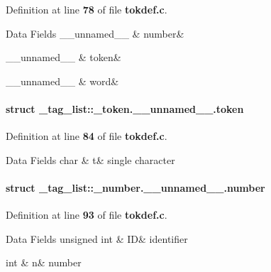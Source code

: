 \-Definition at line {\bf 78} of file {\bf tokdef.\-c}.

\begin{DoxyFields}{\-Data Fields}
\-\_\-\-\_\-unnamed\-\_\-\-\_\-\label{tokdef_8c_ab1bc248a7ff2b2e95569f56de68615df}
&
number&
\\
\hline

\-\_\-\-\_\-unnamed\-\_\-\-\_\-\label{tokdef_8c_a94a08da1fecbb6e8b46990538c7b50b2}
&
token&
\\
\hline

\-\_\-\-\_\-unnamed\-\_\-\-\_\-\label{tokdef_8c_ac47d187067c6cf953245f128b5fde62a}
&
word&
\\
\hline

\end{DoxyFields}
\label{struct__tag__list_1_1__token_8____unnamed_____8token}
\paragraph{struct \-\_\-tag\-\_\-list\-:\-:\-\_\-token.\-\_\-\-\_\-unnamed\-\_\-\-\_\-.\-token}


\-Definition at line {\bf 84} of file {\bf tokdef.\-c}.

\begin{DoxyFields}{\-Data Fields}
char\label{tokdef_8c_ae358efa489f58062f10dd7316b65649e}
&
t&
single character \\
\hline

\end{DoxyFields}
\label{struct__tag__list_1_1__number_8____unnamed_____8number}
\paragraph{struct \-\_\-tag\-\_\-list\-:\-:\-\_\-number.\-\_\-\-\_\-unnamed\-\_\-\-\_\-.\-number}


\-Definition at line {\bf 93} of file {\bf tokdef.\-c}.

\begin{DoxyFields}{\-Data Fields}
unsigned int\label{tokdef_8c_ab718adec73e04ce3ec720dd11a06a308}
&
\-I\-D&
identifier \\
\hline

int\label{tokdef_8c_a7b8b965ad4bca0e41ab51de7b31363a1}
&
n&
number \\
\hline

\end{DoxyFields}
\label{struct__tag__list_1_1__word_8____unnamed_____8word}
